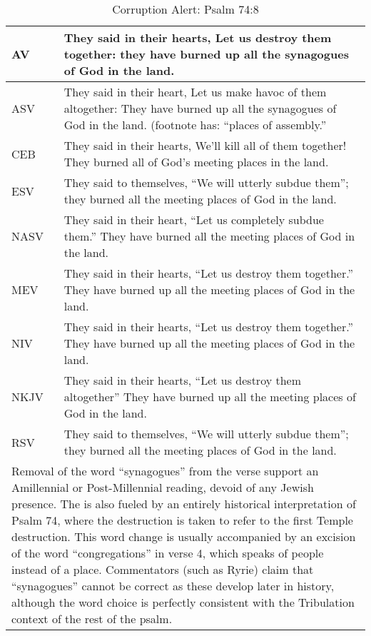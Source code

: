 \begin{center}

\begin{table}[ht]
\centering
\begin{tabular}{|p{.5in}|p{3.5in}|}
\hline

\textcolor[rgb]{0.00,0.00,1.00}{AV} & \textcolor[rgb]{0.00,0.00,1.00}{They said in their hearts, Let us destroy them together: they have burned up all the synagogues of God in the land.} \\ \hline 

\hline
\hline


ASV &  They said in their heart, Let us make havoc of them altogether: They have burned up all the synagogues of God in the land. (footnote has: ``places of assembly.'' \\ \hline
CEB &  They said in their hearts, We’ll kill all of them together! They burned all of God’s meeting places in the land.\\ \hline
ESV & They said to themselves, ``We will utterly subdue them''; they burned all the meeting places of God in the land. \\ \hline
NASV &  They said in their heart, ``Let us completely subdue them.'' They have burned all the meeting places of God in the land. \\ \hline
MEV & They said in their hearts, ``Let us destroy them together.''     They have burned up all the meeting places of God in the land.\\ \hline
NIV &  They said in their hearts, ``Let us destroy them together.''     They have burned up all the meeting places of God in the land.\\ \hline
NKJV &  They said in their hearts, ``Let us destroy them altogether'' They have burned up all the meeting places of God in the land. \\ \hline
RSV &  They said to themselves, ``We will utterly subdue them'';  they burned all the meeting places of God in the land.\\ \hline

\hline
\hline

\multicolumn{2}{|p{4.3in}|}{{\textcolor{jungle}{Removal of the word ``synagogues'' from the verse support an Amillennial or Post-Millennial reading, devoid of any Jewish presence. The is also fueled by an entirely historical interpretation of Psalm 74, where the destruction is taken to refer to the first Temple destruction. This word change is usually accompanied by an excision of the word ``congregations'' in verse 4, which speaks of people instead of a place. Commentators (such as Ryrie) claim that ``synagogues'' cannot be correct as these develop later in history, although the word choice is perfectly consistent with the Tribulation context of the rest of the psalm.}}} \\ \hline

\end{tabular}
\caption[Corruption Alert: Psalm 74:8]{Corruption Alert: Psalm 74:8} \label{table:Corruption Psalm 74:8}

\end{table}

\end{center}


